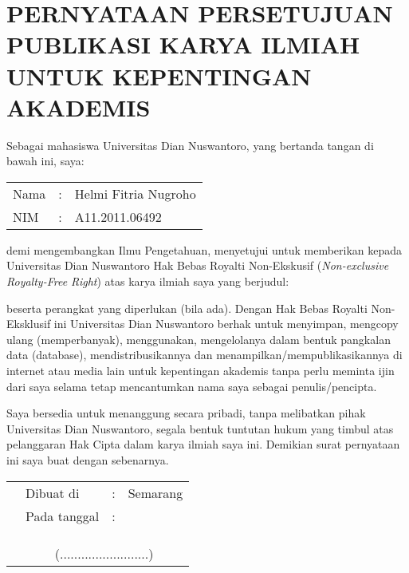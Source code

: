\documentclass[laporan.tex]{subfiles}
\begin{document}
\chapter*{PERNYATAAN PERSETUJUAN PUBLIKASI KARYA ILMIAH UNTUK KEPENTINGAN AKADEMIS}

Sebagai mahasiswa Universitas Dian Nuswantoro, yang bertanda tangan di bawah ini, saya:

\begin{tabular}{l c l}
Nama & : & Helmi Fitria Nugroho \\
NIM & : & A11.2011.06492 \\
\end{tabular}

demi mengembangkan Ilmu Pengetahuan, menyetujui untuk memberikan kepada Universitas Dian Nuswantoro Hak Bebas Royalti Non-Ekskusif (\emph{Non-exclusive Royalty-Free Right}) atas karya ilmiah saya yang berjudul:


\normalfont
beserta perangkat yang diperlukan (bila ada). Dengan Hak Bebas Royalti Non-Eksklusif ini Universitas Dian Nuswantoro berhak untuk menyimpan, mengcopy ulang (memperbanyak), menggunakan, mengelolanya dalam bentuk pangkalan data (database), mendistribusikannya dan menampilkan/mempublikasikannya di internet atau media lain untuk kepentingan akademis tanpa perlu meminta ijin dari saya selama tetap mencantumkan nama saya sebagai penulis/pencipta.

Saya bersedia untuk menanggung secara pribadi, tanpa melibatkan pihak Universitas Dian Nuswantoro, segala bentuk tuntutan hukum yang timbul atas pelanggaran Hak Cipta dalam karya ilmiah saya ini.
Demikian surat pernyataan ini saya buat dengan sebenarnya.

\begin{tabular}{p{18em} l c l}
& Dibuat di & : & Semarang \\
& Pada tanggal & : & \\
& & \\
& & \\
& & \\
& \multicolumn{3}{c}{(.........................)} \\
\end{tabular}
\end{document}
